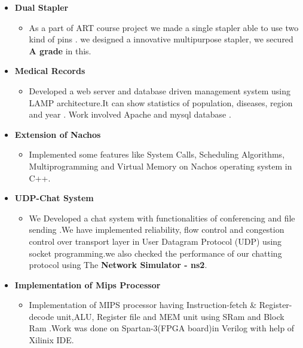\documentclass[margin]{res}
\makeatletter
\newcommand{\resitem}[1]{\item #1 \vspace{-2pt}}
\newcommand{\ressubheading}[4]{
\begin{tabular*}{6.5in}{l@{\extracolsep{\fill}}r}
		\textbf{#1} & #2 \\
		\textit{#3} & \textit{#4} \\
\end{tabular*}\vspace{-6pt}}
\makeatother
\begin{document}
\begin{itemize}
		\vspace{-0.1in}
			\item \textbf{Dual Stapler }	
		\vspace{-0.1in}
		\begin{itemize}
		\resitem{As a part of ART course project we made a single stapler able to use two kind of pins . we  designed a innovative multipurpose stapler, we secured \textbf{A grade} in this.}
		\end{itemize}	
		\vspace{-0.1in}
			\item \textbf{Medical Records }
		\vspace{-0.1in}
		\begin{itemize}
		\resitem{ Developed a web server and database driven management system  using LAMP architecture.It can show statistics of population, diseases, region and  year . Work involved Apache  and mysql database .}
	
		\end{itemize}	
		\vspace{-0.1in}
\item \textbf{Extension of Nachos }
		\vspace{-0.1in}
		\begin{itemize}
		\resitem{Implemented some features like System Calls, Scheduling Algorithms, Multiprogramming and Virtual Memory on Nachos  operating system in C++.}
		\end{itemize}
	
	
\vspace{-0.1in}	
\item \textbf{UDP-Chat System }	
		\vspace{-0.1in}
		\begin{itemize}
		\resitem{We Developed a chat system with functionalities of conferencing and file sending .We have implemented reliability, flow control and congestion control over transport layer in User Datagram Protocol (UDP) using socket programming.we also checked the performance of our chatting protocol using The \textbf{Network Simulator - ns2}.}
		\end{itemize}
		
\vspace{-0.1in}
\item	\textbf{Implementation of Mips Processor }
		\begin{itemize}
		\vspace{-0.1in}
		\resitem{Implementation of MIPS processor having Instruction-fetch \& Register-decode unit,ALU, Register file and MEM unit using SRam and Block Ram .Work was done on Spartan-3(FPGA board)in Verilog with help of Xilinix IDE.}
	

\end{itemize}
\end{itemize}
\end{document}
